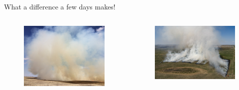 \documentclass[11pt]{beamer}
\begin{document}
\begin{frame}{What a difference a few days makes! } 
	\begin{columns}
		\begin{column}{0.5\textwidth}
				\begin{center}
				\begin{figure}
					\includegraphics[width=0.9\linewidth]{figs/GoodBurn} 
				\end{figure}
			\end{center}
		\end{column}
		\begin{column}{0.5\textwidth}  
			\begin{center}
				\begin{figure}
					\includegraphics[width=1\linewidth]{figs/StreeterFire_17}  
				\end{figure}
			\end{center}
		\end{column}
	\end{columns}
\centering
{}
\end{frame}
\end{document}
